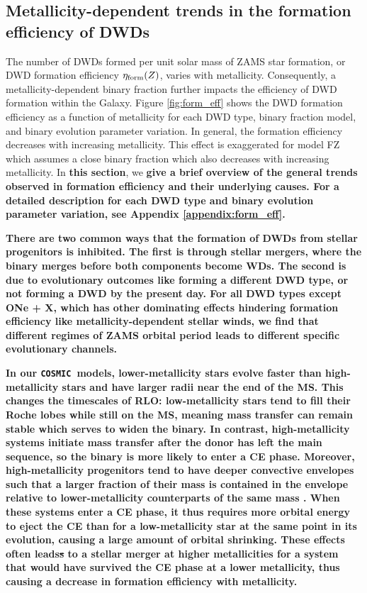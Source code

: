 \documentclass[twocolumn]{aastex631}
\newcommand{\cosmic}{\texttt{COSMIC}}
\begin{document}
\subsection{Metallicity-dependent trends in the formation efficiency of DWDs}\label{sec:formeff}
The number of DWDs formed per unit solar mass of ZAMS star formation, or DWD formation efficiency $\eta_{\rm{form}}(Z)$, varies with metallicity. Consequently, a metallicity-dependent binary fraction further impacts the efficiency of DWD formation within the Galaxy. Figure \ref{fig:form_eff} shows the DWD formation efficiency as a function of metallicity for each DWD type, binary fraction model, and binary evolution parameter variation. In general, the formation efficiency decreases with increasing metallicity. This effect is exaggerated for model FZ which assumes a close binary fraction which also decreases with increasing metallicity. In \textbf{this section}, we \textbf{give a brief overview of the general trends observed in formation efficiency and their underlying causes. For a detailed description for each DWD type and binary evolution parameter variation, see Appendix \ref{appendix:form_eff}.}

\textbf{There are two common ways that the formation of DWDs from stellar progenitors is inhibited. The first is through stellar mergers, where the binary merges before both components become WDs. The second is due to evolutionary outcomes like forming a different DWD type, or not forming a DWD by the present day. For all DWD types except ONe + X, which has other dominating \textbf{effects} hindering formation efficiency like metallicity-dependent stellar winds, we find that different regimes of ZAMS orbital period leads to different specific evolutionary channels.}

\textbf{In our \cosmic\ models, lower-metallicity stars evolve faster than high-metallicity stars and have larger radii near the end of the MS. This changes the timescales of RLO: low-metallicity stars tend to fill their Roche lobes while still on the MS, meaning mass transfer can remain stable which serves to widen the binary. In contrast, high-metallicity systems initiate mass transfer after the donor has left the main sequence, so the binary is more likely to enter a CE phase. Moreover, high-metallicity progenitors tend to have deeper convective envelopes such that a larger fraction of their mass is contained in the envelope relative to lower-metallicity counterparts of the same mass \citep{Amard2019, Amard2020}. When these systems enter a CE phase, it thus requires more orbital energy to eject the CE than for a low-metallicity star at the same point in its evolution, causing a large amount of orbital shrinking. These effects often leads{\sout{s}} to a stellar merger at higher metallicities for a system that would have survived the CE phase at a lower metallicity, thus causing a decrease in formation efficiency with metallicity.} 
\end{document}
